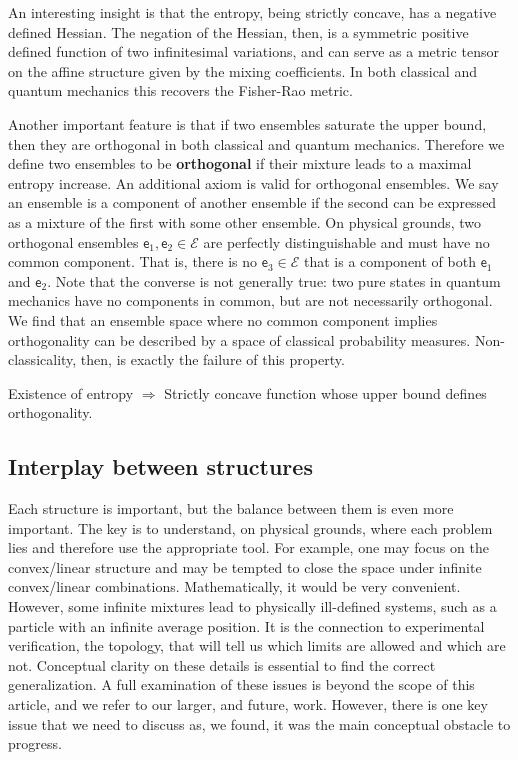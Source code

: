 \documentclass[10pt,twocolumn, nofootinbib]{revtex4-2}
\newcommand{\ens}[1][e] {\mathsf{#1}} %
\newcommand{\Ens}[1][E] {\mathcal{#1}} %
\begin{document}
An interesting insight is that the entropy, being strictly concave, has a negative defined Hessian. The negation of the Hessian, then, is a symmetric positive defined function of two infinitesimal variations, and can serve as a metric tensor on the affine structure given by the mixing coefficients. In both classical and quantum mechanics this recovers the Fisher-Rao metric.

Another important feature is that if two ensembles saturate the upper bound, then they are orthogonal in both classical and quantum mechanics. Therefore we define two ensembles to be \textbf{orthogonal} if their mixture leads to a maximal entropy increase. An additional axiom is valid for orthogonal ensembles. We say an ensemble is a component of another ensemble if the second can be expressed as a mixture of the first with some other ensemble. On physical grounds, two orthogonal ensembles $\ens_1, \ens_2 \in \Ens$ are perfectly distinguishable and must have no common component. That is, there is no $\ens_3 \in \Ens$ that is a component of both $\ens_1$ and $\ens_2$. Note that the converse is not generally true: two pure states in quantum mechanics have no components in common, but are not necessarily orthogonal. We find that an ensemble space where no common component implies orthogonality can be described by a space of classical probability measures. Non-classicality, then, is exactly the failure of this property.

\begin{tcolorbox}[colback=white, colframe=black]
	Existence of entropy $\Rightarrow$ Strictly concave function whose upper bound defines orthogonality.
\end{tcolorbox}

\subsection{Interplay between structures}

Each structure is important, but the balance between them is even more important. The key is to understand, on physical grounds, where each problem lies and therefore use the appropriate tool. For example, one may focus on the convex/linear structure and may be tempted to close the space under infinite convex/linear combinations. Mathematically, it would be very convenient. However, some infinite mixtures lead to physically ill-defined systems, such as a particle with an infinite average position. It is the connection to experimental verification, the topology, that will tell us which limits are allowed and which are not. Conceptual clarity on these details is essential to find the correct generalization. A full examination of these issues is beyond the scope of this article, and we refer to our larger, and future, work. However, there is one key issue that we need to discuss as, we found, it was the main conceptual obstacle to progress.
\end{document}
